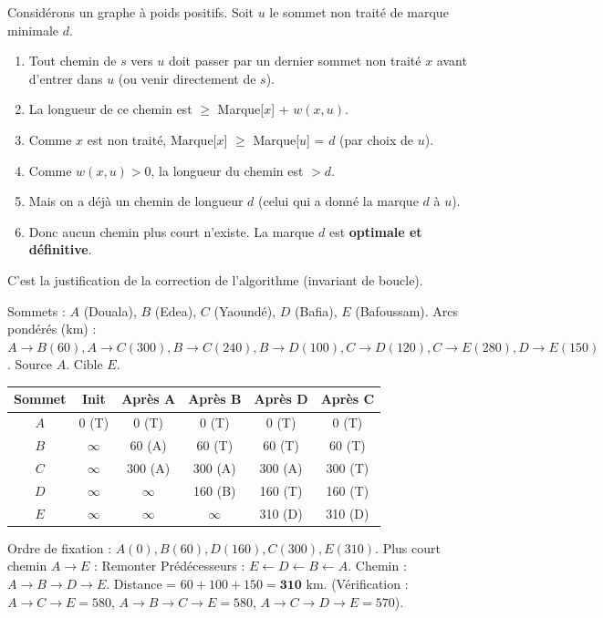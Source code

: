 \documentclass[11pt]{article}
\begin{document}
\begin{experience}
Considérons un graphe à poids positifs. Soit $u$ le sommet non traité de marque minimale $d$.
\begin{enumerate}
  \item Tout chemin de $s$ vers $u$ doit passer par un dernier sommet non traité $x$ avant d'entrer dans $u$ (ou venir directement de $s$).
  \item La longueur de ce chemin est $\ge$ Marque[$x$] + $w(x,u)$.
  \item Comme $x$ est non traité, Marque[$x$] $\ge$ Marque[$u$] = $d$ (par choix de $u$).
  \item Comme $w(x,u) > 0$, la longueur du chemin est $> d$.
  \item Mais on a déjà un chemin de longueur $d$ (celui qui a donné la marque $d$ à $u$).
  \item Donc aucun chemin plus court n'existe. La marque $d$ est \textbf{optimale et définitive}.
\end{enumerate}
C'est la justification de la correction de l'algorithme (invariant de boucle).
\end{experience}

\begin{exemplebox}
Sommets : $A$ (Douala), $B$ (Edea), $C$ (Yaoundé), $D$ (Bafia), $E$ (Bafoussam).
Arcs pondérés (km) : $A\to B(60), A\to C(300), B\to C(240), B\to D(100), C\to D(120), C\to E(280), D\to E(150)$.
Source $A$. Cible $E$.
\begin{center}
\begin{tabular}{|c|c|c|c|c|c|}
\hline
\textbf{Sommet} & \textbf{Init} & \textbf{Après A} & \textbf{Après B} & \textbf{Après D} & \textbf{Après C} \\
\hline
$A$ & 0 (T) & 0 (T) & 0 (T) & 0 (T) & 0 (T) \\
$B$ & $\infty$ & 60 (A) & 60 (T) & 60 (T) & 60 (T) \\
$C$ & $\infty$ & 300 (A) & 300 (A) & 300 (A) & 300 (T) \\
$D$ & $\infty$ & $\infty$ & 160 (B) & 160 (T) & 160 (T) \\
$E$ & $\infty$ & $\infty$ & $\infty$ & 310 (D) & 310 (D) \\
\hline
\end{tabular}
\end{center}
Ordre de fixation : $A (0), B (60), D (160), C (300), E (310)$.
Plus court chemin $A \to E$ : Remonter Prédécesseurs : $E \leftarrow D \leftarrow B \leftarrow A$.
Chemin : $A \to B \to D \to E$. Distance = $60+100+150 = \mathbf{310}$ km.
(Vérification : $A\to C\to E = 580$, $A\to B\to C\to E = 580$, $A\to C\to D\to E = 570$).
\end{exemplebox}
\end{document}
